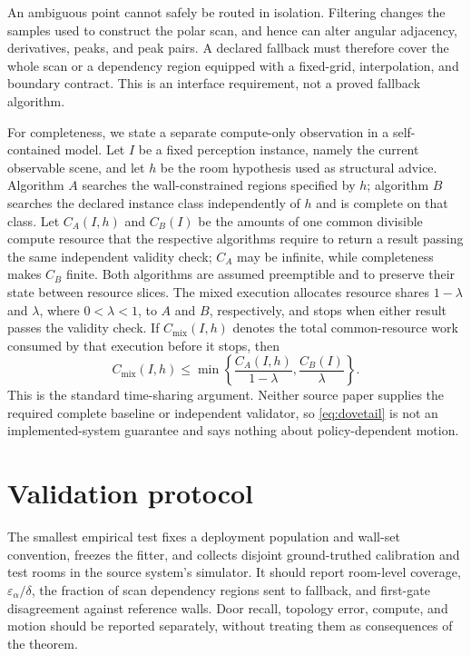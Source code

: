\documentclass{article}
\begin{document}
An ambiguous point cannot safely be routed in isolation. Filtering changes the samples used to construct the polar scan, and hence can alter angular adjacency, derivatives, peaks, and peak pairs. A declared fallback must therefore cover the whole scan or a dependency region equipped with a fixed-grid, interpolation, and boundary contract. This is an interface requirement, not a proved fallback algorithm.

For completeness, we state a separate compute-only observation in a self-contained model. Let $I$ be a fixed perception instance, namely the current observable scene, and let $h$ be the room hypothesis used as structural advice. Algorithm $A$ searches the wall-constrained regions specified by $h$; algorithm $B$ searches the declared instance class independently of $h$ and is complete on that class. Let $C_A(I,h)$ and $C_B(I)$ be the amounts of one common divisible compute resource that the respective algorithms require to return a result passing the same independent validity check; $C_A$ may be infinite, while completeness makes $C_B$ finite. Both algorithms are assumed preemptible and to preserve their state between resource slices. The mixed execution allocates resource shares $1-\lambda$ and $\lambda$, where $0<\lambda<1$, to $A$ and $B$, respectively, and stops when either result passes the validity check. If $C_{\mathrm{mix}}(I,h)$ denotes the total common-resource work consumed by that execution before it stops, then
\begin{equation}
 C_{\mathrm{mix}}(I,h)\leq
 \min\left\{\frac{C_A(I,h)}{1-\lambda},
             \frac{C_B(I)}{\lambda}\right\}.
 \label{eq:dovetail}
\end{equation}
This is the standard time-sharing argument. Neither source paper supplies the required complete baseline or independent validator, so \eqref{eq:dovetail} is not an implemented-system guarantee and says nothing about policy-dependent motion.

\section{Validation protocol}

The smallest empirical test fixes a deployment population and wall-set convention, freezes the fitter, and collects disjoint ground-truthed calibration and test rooms in the source system's simulator. It should report room-level coverage, $\varepsilon_\alpha/\delta$, the fraction of scan dependency regions sent to fallback, and first-gate disagreement against reference walls. Door recall, topology error, compute, and motion should be reported separately, without treating them as consequences of the theorem.
\end{document}
